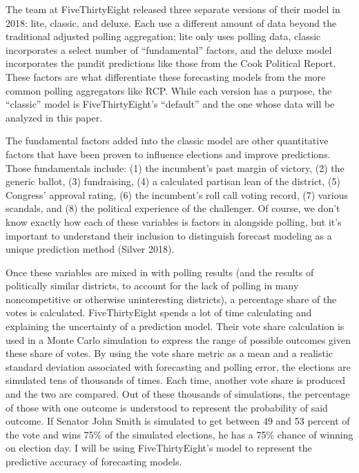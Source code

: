 \documentclass[]{article}
\begin{document}
The team at FiveThirtyEight released three separate versions of their
model in 2018: lite, classic, and deluxe. Each use a different amount of
data beyond the traditional adjusted polling aggregation; lite only uses
polling data, classic incorporates a select number of ``fundamental''
factors, and the deluxe model incorporates the pundit predictions like
those from the Cook Political Report. These factors are what
differentiate these forecasting models from the more common polling
aggregators like RCP. While each version has a purpose, the ``classic''
model is FiveThirtyEight's ``default'' and the one whose data will be
analyzed in this paper.

The fundamental factors added into the classic model are other
quantitative factors that have been proven to influence elections and
improve predictions. Those fundamentals include: (1) the incumbent's
past margin of victory, (2) the generic ballot, (3) fundraising, (4) a
calculated partisan lean of the district, (5) Congress' approval rating,
(6) the incumbent's roll call voting record, (7) various scandals, and
(8) the political experience of the challenger. Of course, we don't know
exactly how each of these variables is factors in alongside polling, but
it's important to understand their inclusion to distinguish forecast
modeling as a unique prediction method (Silver 2018).

Once these variables are mixed in with polling results (and the results
of politically similar districts, to account for the lack of polling in
many noncompetitive or otherwise uninteresting districts), a percentage
share of the votes is calculated. FiveThirtyEight spends a lot of time
calculating and explaining the uncertainty of a prediction model. Their
vote share calculation is used in a Monte Carlo simulation to express
the range of possible outcomes given these share of votes. By using the
vote share metric as a mean and a realistic standard deviation
associated with forecasting and polling error, the elections are
simulated tens of thousands of times. Each time, another vote share is
produced and the two are compared. Out of these thousands of
simulations, the percentage of those with one outcome is understood to
represent the probability of said outcome. If Senator John Smith is
simulated to get between 49 and 53 percent of the vote and wins 75\% of
the simulated elections, he has a 75\% chance of winning on election
day. I will be using FiveThirtyEight's model to represent the predictive
accuracy of forecasting models.
\end{document}
